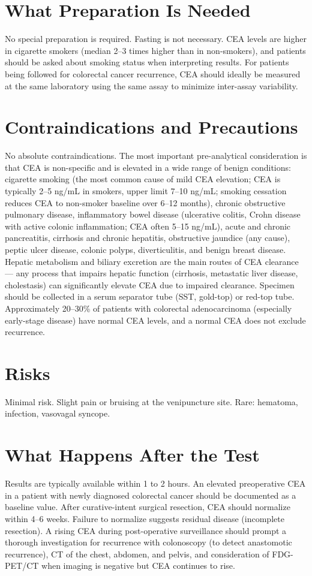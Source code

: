 \section*{What Preparation Is Needed}
No special preparation is required. Fasting is not necessary. CEA levels are higher in cigarette smokers (median 2--3 times higher than in non-smokers), and patients should be asked about smoking status when interpreting results. For patients being followed for colorectal cancer recurrence, CEA should ideally be measured at the same laboratory using the same assay to minimize inter-assay variability.

\section*{Contraindications and Precautions}
No absolute contraindications. The most important pre-analytical consideration is that CEA is non-specific and is elevated in a wide range of benign conditions: cigarette smoking (the most common cause of mild CEA elevation; CEA is typically 2--5 ng/mL in smokers, upper limit 7--10 ng/mL; smoking cessation reduces CEA to non-smoker baseline over 6--12 months), chronic obstructive pulmonary disease, inflammatory bowel disease (ulcerative colitis, Crohn disease with active colonic inflammation; CEA often 5--15 ng/mL), acute and chronic pancreatitis, cirrhosis and chronic hepatitis, obstructive jaundice (any cause), peptic ulcer disease, colonic polyps, diverticulitis, and benign breast disease. Hepatic metabolism and biliary excretion are the main routes of CEA clearance --- any process that impairs hepatic function (cirrhosis, metastatic liver disease, cholestasis) can significantly elevate CEA due to impaired clearance. Specimen should be collected in a serum separator tube (SST, gold-top) or red-top tube. Approximately 20--30\% of patients with colorectal adenocarcinoma (especially early-stage disease) have normal CEA levels, and a normal CEA does not exclude recurrence.

\section*{Risks}
Minimal risk. Slight pain or bruising at the venipuncture site. Rare: hematoma, infection, vasovagal syncope.

\section*{What Happens After the Test}
Results are typically available within 1 to 2 hours. An elevated preoperative CEA in a patient with newly diagnosed colorectal cancer should be documented as a baseline value. After curative-intent surgical resection, CEA should normalize within 4--6 weeks. Failure to normalize suggests residual disease (incomplete resection). A rising CEA during post-operative surveillance should prompt a thorough investigation for recurrence with colonoscopy (to detect anastomotic recurrence), CT of the chest, abdomen, and pelvis, and consideration of FDG-PET/CT when imaging is negative but CEA continues to rise.

